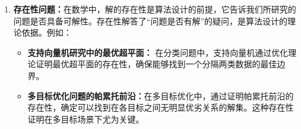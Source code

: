 \begin{enumerate}
\begin{itemize}
\item {\bf 凸优化假设：} 在神经网络训练中，我们假设损失函数为凸函数来分析算法收敛性和解的稳定性，因为凸函数可以保证找到优化问题存在全局最优解。然而实际中的损失函数往往是非凸的，导致全局最优解难以找到，但凸优化理论仍为非凸优化的启发式方法提供了基础。
\item{\bf 无噪声数据假设：} 在信号处理或统计学习中，我们通常假设数据没有噪声，即数据完全准确无误。这个理想情形让我们可以专注于分析算法的基本特性和效果。尽管现实数据几乎总是带有噪声，这一假设帮助我们更清楚地理解算法在“最优条件”下的性能。
\item{\bf 完全信息假设：} 在强化学习中，通常假设智能体可以完全观察到状态的所有信息（完全信息），这被称为马尔可夫决策过程（MDP）。这一理想假设使得我们能够推导出解决MDP的核心算法，如Q-learning和动态规划，从而允许智能体基于当前状态做出最优决策。尽管在实际应用中，智能体常只能观测到部分信息，信息往往是不完全的。因此需要用部分可观测马尔可夫决策过程（POMDP）来建模。
\item{\bf 均匀分布假设：} 在随机算法或统计推断中，均匀分布是理想化的假设之一。例如在蒙特卡洛模拟中，假设数据或样本来自均匀分布以简化概率计算。均匀分布假设常常使得复杂问题更易于处理，尽管在现实中，数据的分布通常不均匀，这一理想情形仍为其他分布下的理论分析提供了起点。
\end{itemize}
这些理想情形帮助研究者在数学框架下构建简化模型，使得智能系统的行为可以被有效分析。这些理想化的假设虽然不完全适用于现实中的复杂性，但为现实条件下的实际研究提供了启发。
\item  {\bf 存在性问题：}在数学中，解的存在性是算法设计的前提，它告诉我们所研究的问题是否具备可解性。存在性解答了“问题是否有解”的疑问，是算法设计的理论依据。例如：
\begin{itemize}
\item {\bf 支持向量机研究中的最优超平面：} 在分类问题中，支持向量机通过优化理论证明最优超平面的存在性，确保能够找到一个分隔两类数据的最佳边界。
\item {\bf 多目标优化问题的帕累托前沿：}在多目标优化中，通过证明帕累托前沿的存在性，确定可以找到在各目标之间无明显优劣关系的解集。这种存在性证明在多目标场景下尤为关键。


\end{itemize}
\end{enumerate}
